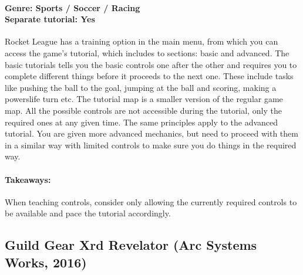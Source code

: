 \paragraph{Genre: Sports / Soccer / Racing \\ Separate tutorial: Yes \\}
Rocket League has a training option in the main menu, from which you can access the game's tutorial, which includes to sections: basic and advanced.
The basic tutorials tells you the basic controls one after the other and requires you to complete different things before it proceeds to the next one. These include tasks like pushing the ball to the goal, jumping at the ball and scoring, making a powerslife turn etc. The tutorial map is a smaller version of the regular game map. All the possible controls are not accessible during the tutorial, only the required ones at any given time.
The same principles apply to the advanced tutorial. You are given more advanced mechanics, but need to proceed with them in a similar way with limited controls to make sure you do things in the required way.
\paragraph{Takeaways:}
When teaching controls, consider only allowing the currently required controls to be available and pace the tutorial accordingly.

\subsection{Guild Gear Xrd Revelator (Arc Systems Works, 2016)}

